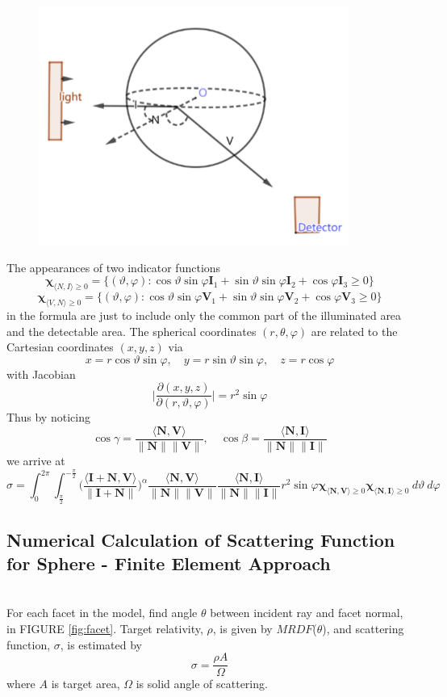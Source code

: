 \documentclass[11pt]{amsart}
\newcommand{\ip}[2]{\langle {#1}, {#2} \rangle}
\theoremstyle{definition}
\begin{document}
\begin{figure}[h!]
  \includegraphics[width=4in]{./figs/Sphere_edit.pdf}
  \label{fig:sphere}
\end{figure}
The appearances of two indicator functions 
$$\mathbf{\chi}_{\ip{N}{I}\geq 0}=\{(\vartheta,\varphi):\cos\vartheta\sin\varphi\mathbf{I}_1+\sin\vartheta\sin\varphi\mathbf{I}_2+\cos\varphi\mathbf{I}_3\geq 0\}$$ 
$$\mathbf{\chi}_{\ip{V}{N}\geq 0}=\{(\vartheta,\varphi): \cos\vartheta\sin\varphi\mathbf{V}_1+\sin\vartheta\sin\varphi\mathbf{V}_2+\cos\varphi\mathbf{V}_3\geq 0\}$$ 
in the formula are just to include only the common part of the illuminated area and the detectable area.
The spherical coordinates $(r,\theta,\varphi)$ are related to the Cartesian coordinates $(x,y,z)$ via
$$x =r\cos\vartheta \sin\varphi, \quad y=r\sin\vartheta \sin\varphi, \quad z=r\cos\varphi $$
with Jacobian 
$$\bigg|\frac{\partial(x,y,z)}{\partial(r,\vartheta,\varphi)}\bigg|= r^2 \sin\varphi $$
Thus by noticing 
$$\cos\gamma =\frac{\ip{\mathbf{N}}{\mathbf{V}}}{\|\mathbf{N}\| \|\mathbf{V}\|},\quad \cos\beta=\frac{\ip{\mathbf{N}}{\mathbf{I}}}{\|\mathbf{N}\| \|\mathbf{I}\|}$$
we arrive at
  $$\sigma =\int_{0}^{2\pi}\int_{\frac{\pi}{2}}^{-\frac{\pi}{2}}\Bigg(\frac{\ip{\mathbf{I}+\mathbf{N}}{\mathbf{V}}}{\|\mathbf{I}+\mathbf{N}\|}\Bigg)^\alpha\frac{\ip{\mathbf{N}}{\mathbf{V}}}{\|\mathbf{N}\| \|\mathbf{V}\|}\frac{\ip{\mathbf{N}}{\mathbf{I}}}{\|\mathbf{N}\| \|\mathbf{I}\|}r^2\sin\varphi\mathbf{\chi}_{\ip{\mathbf{N}}{\mathbf{V}}\geq 0}\mathbf{\chi}_{\ip{\mathbf{N}}{\mathbf{I}}\geq 0} \: d\vartheta \: d\varphi$$
  
\subsection{Numerical Calculation of Scattering Function for Sphere - Finite Element Approach}~\\
For each facet in the model, find angle $\theta$ between incident ray and facet normal, in FIGURE \ref{fig:facet}. Target relativity, $\rho$, is given by $MRDF$($\theta$), and scattering function, $\sigma$, is estimated by
\begin{equation}
\sigma =\frac{\rho A}{\Omega}
\end{equation} 
where $A$ is target area, $\Omega$ is solid angle of scattering.
\end{document}
